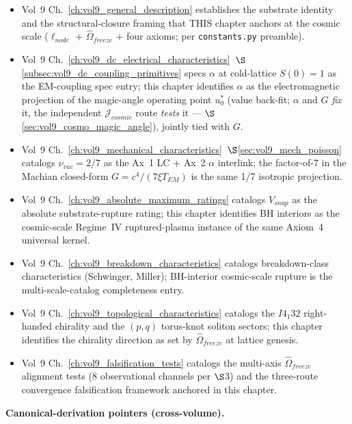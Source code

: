 \begin{itemize}
    \item Vol~9 Ch.~\ref{ch:vol9_general_description} establishes the substrate identity and the structural-closure framing that THIS chapter anchors at the cosmic scale ($\ell_{node}$ + $\hat{\Omega}_{freeze}$ + four axioms; per \texttt{constants.py} preamble).
    \item Vol~9 Ch.~\ref{ch:vol9_dc_electrical_characteristics}~$\S$\ref{subsec:vol9_dc_coupling_primitives} specs $\alpha$ at cold-lattice $S(0) = 1$ as the EM-coupling spec entry; this chapter identifies $\alpha$ as the electromagnetic projection of the magic-angle operating point $u_0^*$ (value back-fit; $\alpha$ and $G$ \emph{fix} it, the independent $\mathcal{J}_{cosmic}$ route \emph{tests} it --- $\S$\ref{sec:vol9_cosmo_magic_angle}), jointly tied with $G$.
    \item Vol~9 Ch.~\ref{ch:vol9_mechanical_characteristics}~$\S$\ref{sec:vol9_mech_poisson} catalogs $\nu_{vac} = 2/7$ as the Ax~1 LC + Ax~2 $\alpha$ interlink; the factor-of-7 in the Machian closed-form $G = c^4/(7\xi T_{EM})$ is the same 1/7 isotropic projection.
    \item Vol~9 Ch.~\ref{ch:vol9_absolute_maximum_ratings} catalogs $V_{snap}$ as the absolute substrate-rupture rating; this chapter identifies BH interiors as the cosmic-scale Regime~IV ruptured-plasma instance of the same Axiom~4 universal kernel.
    \item Vol~9 Ch.~\ref{ch:vol9_breakdown_characteristics} catalogs breakdown-class characteristics (Schwinger, Miller); BH-interior cosmic-scale rupture is the multi-scale-catalog completeness entry.
    \item Vol~9 Ch.~\ref{ch:vol9_topological_characteristics} catalogs the $I4_1 32$ right-handed chirality and the $(p, q)$ torus-knot soliton sectors; this chapter identifies the chirality direction as set by $\hat{\Omega}_{freeze}$ at lattice genesis.
    \item Vol~9 Ch.~\ref{ch:vol9_falsification_tests} catalogs the multi-axis $\hat{\Omega}_{freeze}$ alignment tests (8 observational channels per  $\S$3) and the three-route convergence falsification framework anchored in this chapter.
\end{itemize}

\textbf{Canonical-derivation pointers (cross-volume).}

